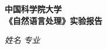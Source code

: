 \begin{center}
  \LARGE \bf 中国科学院大学 \\《自然语言处理》实验报告
\end{center}

\begin{center}
  \emph{姓名} \underline{\makebox[8em][c]{\name}} 
  \emph{专业} \underline{\makebox[15em][c]{\major}}\\
\end{center}


  